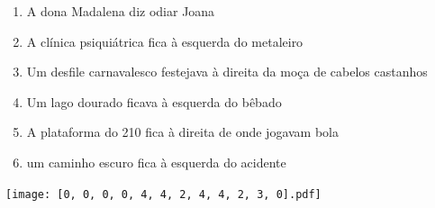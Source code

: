 \documentclass[12pt]{article}
\begin{document}
		 

\pagebreak


	\begin{enumerate}
		  \sffamily %
		  \large %


\vfill \item
A dona Madalena	%
diz odiar Joana	%

\vfill \item
A clínica psiquiátrica fica	%
à esquerda
do metaleiro	%

\vfill \item
Um desfile carnavalesco festejava	%
à direita
da moça de cabelos castanhos	%

\vfill \item
Um lago dourado ficava	%
à esquerda
do bêbado	%

\vfill \item
A plataforma do 210 fica	%
à direita
de onde jogavam bola	%

\vfill \item
um caminho escuro fica	%
à esquerda
do acidente	%
	\end{enumerate}
		  
		  \hfill

		  \vfill

\texttt{[image: [0, 0, 0, 0, 4, 4, 2, 4, 4, 2, 3, 0].pdf]}


	\hfill	  	  


\pagebreak			
\end{document}
